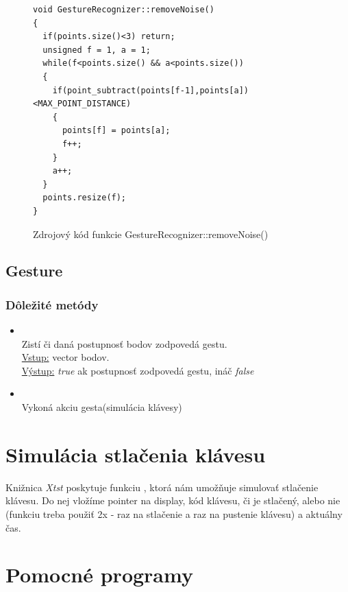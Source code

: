 \begin{figure}[htp]
\begin{lstlisting}
void GestureRecognizer::removeNoise()
{  
  if(points.size()<3) return;
  unsigned f = 1, a = 1;
  while(f<points.size() && a<points.size())
  {
    if(point_subtract(points[f-1],points[a])<MAX_POINT_DISTANCE)
    {
      points[f] = points[a];
      f++;
    }
    a++;
  }
  points.resize(f);
}
\end{lstlisting}
\caption{Zdrojový kód funkcie GestureRecognizer::removeNoise()}
\label{fig:removeNoise}
\end{figure}

\eject
\subsection{Gesture}

\subsubsection{Dôležité metódy}
\begin{itemize}
\item {}
\\Zistí či daná postupnosť bodov zodpovedá gestu.
\\ \underline{Vstup:} vector bodov.
\\ \underline{Výstup:} \textit{true} ak postupnosť zodpovedá gestu, ináč \textit{false}
\item {}
\\Vykoná akciu gesta(simulácia klávesy)
\end{itemize}


\section{Simulácia stlačenia klávesu}
Knižnica \textit{Xtst} poskytuje funkciu , ktorá nám umožňuje simulovať stlačenie klávesu. Do nej vložíme pointer na display, kód klávesu, či je stlačený, alebo nie (funkciu treba použiť 2x - raz na stlačenie a raz na pustenie klávesu) a aktuálny čas.

\section{Pomocné programy}

